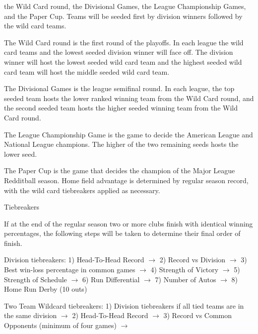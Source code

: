 \begin{deepEnumerate}
\begin{deepEnumerate}
\begin{deepEnumerate}
			the Wild Card round, the Divisional Games, the League Championship Games, and the Paper Cup.
			Teams will be seeded first by division winners followed by the wild card teams.
			\begin{deepEnumerate}
				\item The Wild Card round is the first round of the playoffs. 
				In each league the wild card teams and the lowest seeded division winner will face off. 
				The division winner will host the lowest seeded wild card team 
				and the highest seeded wild card team will host the middle seeded wild card team.
				\item The Divisional Games is the league semifinal round. 
				In each league, the top seeded team hosts the lower ranked winning team from the Wild Card round, 
				and the second seeded team hosts the higher seeded winning team from the Wild Card round.
				\item The League Championship Game is the game to decide the American League and National League champions. 
				The higher of the two remaining seeds hosts the lower seed.
				\item The Paper Cup is the game that decides the champion of the Major League Redditball season. 
				Home field advantage is determined by regular season record, 
				with the wild card tiebreakers applied as necessary.
			\end{deepEnumerate}
			\item Tiebreakers
			\begin{deepEnumerate}
				\item If at the end of the regular season two or more clubs finish with identical winning percentages, the following steps
				will be taken to determine their final order of finish.
				\begin{deepEnumerate}
					\label{sec:Division tiebreakers}
					\item Division tiebreakers:
					1) Head-To-Head Record $\rightarrow$  
					2) Record vs Division $\rightarrow$
					3) Best win-loss percentage in common games $\rightarrow$ 
					4) Strength of Victory $\rightarrow$ 
					5) Strength of Schedule $\rightarrow$ 
					6) Run Differential $\rightarrow$  
					7) Number of Autos $\rightarrow$ 
					8) Home Run Derby (10 outs)
					\label{sec:Wildcard tiebreakers}
					\item Two Team Wildcard tiebreakers:
					1) Division tiebreakers if all tied teams are in the same division $\rightarrow$ 
					2) Head-To-Head Record $\rightarrow$  
					3) Record vs Common Opponents (minimum of four games) $\rightarrow$ 

\end{deepEnumerate}
\end{deepEnumerate}
\end{deepEnumerate}
\end{deepEnumerate}
\end{deepEnumerate}
